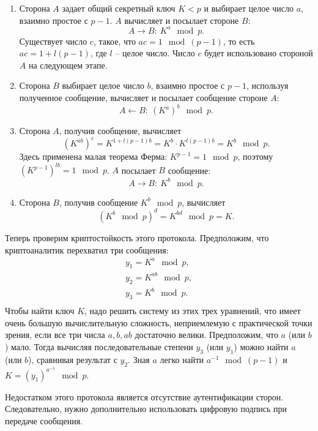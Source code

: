 \begin{enumerate}
    \item Сторона $A$ задает общий секретный ключ $K <p$ и выбирает целое число $a$, взаимно простое с $p-1$. $A$ вычисляет и посылает стороне $B$:
            \[ A \rightarrow B: ~ K^a \mod p. \]
        Существует число $c$, такое, что $a c =1 \mod (p-1)$, то есть $a c = 1 + l (p-1)$, где $l$ -- целое число. Число $c$ будет использовано стороной $A$ на следующем этапе.
    \item Сторона $B$ выбирает целое число $b$, взаимно простое с $p-1$, используя полученное сообщение, вычисляет и посылает сообщение стороне $A$:
            \[ A \leftarrow B: ~ (K^a)^b \mod p. \]
    \item Сторона $A$, получив сообщение, вычисляет
        \[ \left( K^{ab} \right)^c = K^{1 + l (p-1) b} = K^b \cdot K^{l (p-1) b} = K^b \mod p. \]
        Здесь применена малая теорема Ферма: $K^{p-1} = 1 \mod p$, поэтому $\left( K^{p-1} \right)^{lb} = 1 \mod p$.
        $A$ посылает $B$ сообщение:
            \[ A \rightarrow B: ~ K^b \mod p. \]
    \item Сторона $B$, получив сообщение $K^{b}\mod p$, вычисляет
        \[ (K^b \mod p)^d = K^{bd} \mod p = K. \]
\end{enumerate}

Теперь проверим криптостойкость этого протокола. Предположим, что криптоаналитик перехватил три сообщения:
\[ \begin{array}{l}
    y_1 = K^a \mod p, \\
    y_2 = K^{ab} \mod p, \\
    y_3 = K^b \mod p. \\
\end{array} \]
Чтобы найти ключ $K$, надо решить систему из этих трех уравнений, что имеет очень большую вычислительную сложность, неприемлемую с практической точки зрения, если все три числа $a, b, ab$ достаточно велики. Предположим, что $a$ (или $b$) мало. Тогда вычисляя последовательные степени $y_3$ (или $y_1$) можно найти  $a$ (или $b$), сравнивая результат с $y_2$. Зная $a$ легко найти $a^{-1}\mod(p-1)$ и $K=(y_1)^{a^{-1}}\mod p$.

Недостатком этого протокола является отсутствие аутентификации сторон. Следовательно, нужно дополнительно использовать цифровую подпись при передаче сообщения.
